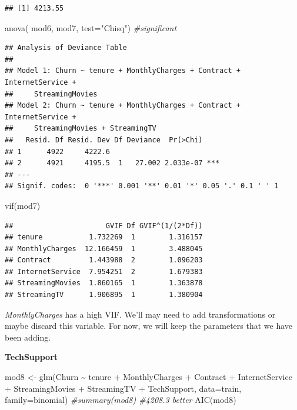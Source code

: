 \documentclass[
  twoside]{article}
\newenvironment{Shaded}{\begin{snugshade}}{\end{snugshade}}
\newcommand{\AttributeTok}[1]{\textcolor[rgb]{0.77,0.63,0.00}{#1}}
\newcommand{\CommentTok}[1]{\textcolor[rgb]{0.56,0.35,0.01}{\textit{#1}}}
\newcommand{\FunctionTok}[1]{\textcolor[rgb]{0.00,0.00,0.00}{#1}}
\newcommand{\NormalTok}[1]{#1}
\newcommand{\OtherTok}[1]{\textcolor[rgb]{0.56,0.35,0.01}{#1}}
\newcommand{\SpecialCharTok}[1]{\textcolor[rgb]{0.00,0.00,0.00}{#1}}
\newcommand{\StringTok}[1]{\textcolor[rgb]{0.31,0.60,0.02}{#1}}
\begin{document}
\begin{verbatim}
## [1] 4213.55
\end{verbatim}

\begin{Shaded}
\begin{Highlighting}[]
\FunctionTok{anova}\NormalTok{( mod6, mod7,  }\AttributeTok{test=}\StringTok{"Chisq"}\NormalTok{) }\CommentTok{\#significant}
\end{Highlighting}
\end{Shaded}

\begin{verbatim}
## Analysis of Deviance Table
## 
## Model 1: Churn ~ tenure + MonthlyCharges + Contract + InternetService + 
##     StreamingMovies
## Model 2: Churn ~ tenure + MonthlyCharges + Contract + InternetService + 
##     StreamingMovies + StreamingTV
##   Resid. Df Resid. Dev Df Deviance  Pr(>Chi)    
## 1      4922     4222.6                          
## 2      4921     4195.5  1   27.002 2.033e-07 ***
## ---
## Signif. codes:  0 '***' 0.001 '**' 0.01 '*' 0.05 '.' 0.1 ' ' 1
\end{verbatim}

\begin{Shaded}
\begin{Highlighting}[]
\FunctionTok{vif}\NormalTok{(mod7)}
\end{Highlighting}
\end{Shaded}

\begin{verbatim}
##                      GVIF Df GVIF^(1/(2*Df))
## tenure           1.732269  1        1.316157
## MonthlyCharges  12.166459  1        3.488045
## Contract         1.443988  2        1.096203
## InternetService  7.954251  2        1.679383
## StreamingMovies  1.860165  1        1.363878
## StreamingTV      1.906895  1        1.380904
\end{verbatim}

\emph{MonthlyCharges} has a high VIF. We'll may need to add
transformations or maybe discard this variable. For now, we will keep
the parameters that we have been adding.

\textbf{TechSupport}

\begin{Shaded}
\begin{Highlighting}[]
\NormalTok{mod8 }\OtherTok{\textless{}{-}} \FunctionTok{glm}\NormalTok{(Churn }\SpecialCharTok{\textasciitilde{}}\NormalTok{ tenure }\SpecialCharTok{+}\NormalTok{ MonthlyCharges }\SpecialCharTok{+}\NormalTok{ Contract }\SpecialCharTok{+}\NormalTok{ InternetService }\SpecialCharTok{+} 
\NormalTok{      StreamingMovies }\SpecialCharTok{+}\NormalTok{ StreamingTV }\SpecialCharTok{+}\NormalTok{ TechSupport, }\AttributeTok{data=}\NormalTok{train, }\AttributeTok{family=}\NormalTok{binomial)}
\CommentTok{\#summary(mod8) \#4208.3 better}
\FunctionTok{AIC}\NormalTok{(mod8)}
\end{Highlighting}
\end{Shaded}
\end{document}
